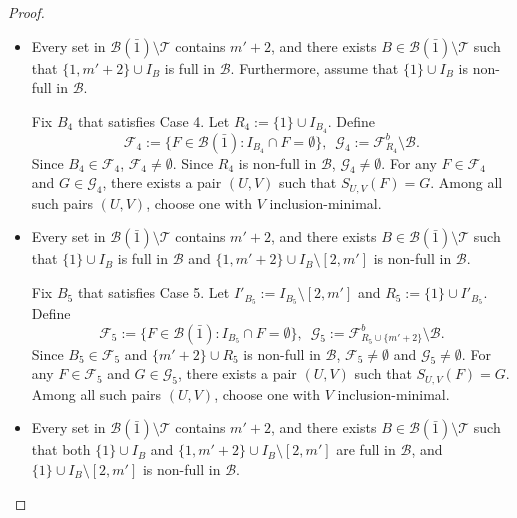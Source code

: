 \documentclass[11pt]{article}
\newcommand{\m}{\mathcal}
\begin{document}
\begin{proof}
\begin{itemize}
\item[Case 4.] Every set in $\m B(\bar{1})\setminus \m T$ contains $m'+2$, and there exists $B\in \m B(\bar{1})\setminus \m T$
such that $\{1,m'+2\}\cup I_B$ is full in $\m B$. 
Furthermore, assume that $\{1\}\cup I_{B}$ is non-full in $\m B$.

Fix $B_4$ that satisfies Case 4. 
Let $R_4:=\{1\}\cup I_{B_4}$. 
Define
\begin{equation*}
    \m F_4:=\{F\in \m B(\bar1): I_{B_4}\cap F=\emptyset\}, \,\,\,
    \m G_4:=\m F_{{R_4}}^b\setminus \m B.
\end{equation*}
Since $B_4\in \m F_4$, $\m F_4\ne \emptyset$.  
Since $R_4$ is non-full in $\m B$,  $\m G_4\ne \emptyset$.
For any $F\in \m F_4$ and $G\in \m G_4$, there exists a pair $(U,V)$ such that $S_{U,V}(F)=G$. Among all such pairs $(U,V)$, choose one with $V$ inclusion-minimal.

\item[Case 5.] Every set in $\m B(\bar{1})\setminus \m T$ contains $m'+2$, and there exists $B\in \m B(\bar{1})\setminus \m T$ such that $\{1\}\cup I_{B}$ is full in $\m B$ and
$\{1,m'+2\}\cup I_{B}\setminus [2,m']$ is non-full in $\m B$.

Fix $B_5$ that satisfies Case 5. 
Let $I'_{B_5}:=I_{B_5}\setminus [2,m']$ and $R_5:=\{1\}\cup I'_{B_5}$.
Define
\begin{equation*}
    \m F_5:=\{F\in \m B(\bar1): I_{B_5}\cap F=\emptyset\}, \,\,\,
    \m G_5:=\m F_{R_5\cup \{m'+2\}}^b\setminus \m B.
\end{equation*}
Since $B_5\in \m F_5$ and $\{m'+2\}\cup R_5$ is non-full in $\m B$, $\m F_5\ne \emptyset$ and $\m G_5\ne \emptyset$. 
For any $F\in \m F_5$ and $G\in \m G_5$, there exists a pair $(U,V)$ such that $S_{U,V}(F)=G$. Among all such pairs $(U,V)$, choose one with $V$ inclusion-minimal.


\item[Case 6.] Every set in $\m B(\bar{1})\setminus \m T$ contains $m'+2$, and there exists $B\in \m B(\bar{1})\setminus \m T$ such that both $\{1\}\cup I_{B}$ and
$\{1,m'+2\}\cup I_{B}\setminus [2,m']$ are full in $\m B$, and $\{1\}\cup I_{B}\setminus [2,m']$ is non-full in $\m B$.


\end{itemize}
\end{proof}
\end{document}
